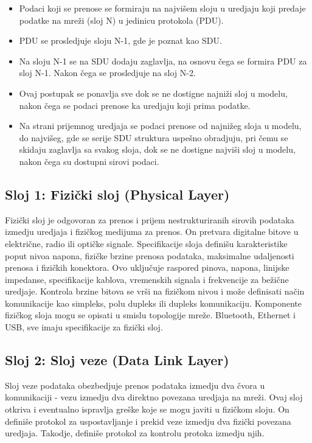 \documentclass[a4paper,12pt, master]{etf}
\begin{document}
	\begin{itemize}
		\item Podaci koji se prenose se formiraju na najvi\v{s}em sloju u
		uredjaju koji predaje podatke na mre\v{z}i (sloj N) u jedinicu
		protokola (PDU).
		\item PDU se prosledjuje sloju N-1, gde je poznat kao SDU.
		\item Na sloju N-1 se na SDU dodaju zaglavlja, na osnovu \v{c}ega se
		formira PDU za sloj N-1. Nakon \v{c}ega se prosledjuje na sloj N-2.
		\item Ovaj postupak se ponavlja sve dok se ne dostigne najni\v{z}i sloj
		u modelu, nakon	\v{c}ega se podaci prenose ka uredjaju koji prima
		podatke.
		\item Na strani prijemnog uredjaja se podaci prenose od najni\v{z}eg
		sloja u modelu, do najvi\v{s}eg, gde se serije SDU struktura
		uspe\v{s}no obradjuju, pri \v{c}emu se skidaju zaglavlja sa svakog
		sloja, dok se ne dostigne najvi\v{s}i sloj u modelu, nakon \v{c}ega su
		dostupni sirovi podaci.
	\end{itemize}

	\subsection{Sloj 1: Fizi\v{c}ki sloj (Physical Layer)}

	Fizi\v{c}ki sloj je odgovoran za prenos i prijem nestrukturiranih sirovih
	podataka izmedju uredjaja i fizi\v{c}kog medijuma za prenos. On pretvara
	digitalne bitove u elektri\v{c}ne, radio ili opti\v{c}ke signale.
	Specifikacije sloja defini\v{s}u karakteristike poput nivoa napona,
	fizi\v{c}ke brzine prenosa podataka, maksimalne udaljenosti prenosa i
	fizi\v{c}kih konektora. Ovo	uklju\v{c}uje raspored pinova, napona, linijske
	impedanse, specifikacije kablova, vremenskih signala i frekvencije za
	be\v{z}i\v{c}ne uredjaje. Kontrola brzine bitova se vr\v{s}i na fizi\v{c}kom
	nivou i mo\v{z}e definisati na\v{c}in komunikacije kao simpleks, polu
	dupleks ili dupleks	komunikaciju. Komponente fizi\v{c}kog sloja mogu se
	opisati u smislu topologije mre\v{z}e. Bluetooth, Ethernet i USB, sve imaju
	specifikacije za fizi\v{c}ki sloj.

	\subsection{Sloj 2: Sloj veze (Data Link Layer)}

	Sloj veze podataka obezbedjuje prenos podataka izmedju dva \v{c}vora u
	komunikaciji - vezu	izmedju dva direktno povezana uredjaja na mre\v{z}i.
	Ovaj sloj otkriva i eventualno ispravlja gre\v{s}ke koje se mogu javiti u
	fizi\v{c}kom sloju. On defini\v{s}e protokol za uspostavljanje i prekid
	veze izmedju dva fizi\v{c}ki povezana uredjaja. Takodje, defini\v{s}e
	protokol za kontrolu protoka izmedju njih.
\end{document}
